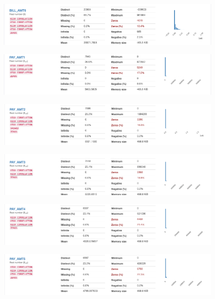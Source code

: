 \begin{figure}[H]
	\centering
	\includegraphics[scale=0.4]{Images/19}
\end{figure}
\begin{figure}[H]
	\centering
	\includegraphics[scale=0.4]{Images/20}
\end{figure}
\begin{figure}[H]
	\centering
	\includegraphics[scale=0.4]{Images/21}
\end{figure}
\begin{figure}[H]
	\centering
	\includegraphics[scale=0.4]{Images/22}
\end{figure}\begin{figure}[H]
\centering
\includegraphics[scale=0.4]{Images/23}
\end{figure}
\begin{figure}[H]
	\centering
	\includegraphics[scale=0.4]{Images/24}
\end{figure}
